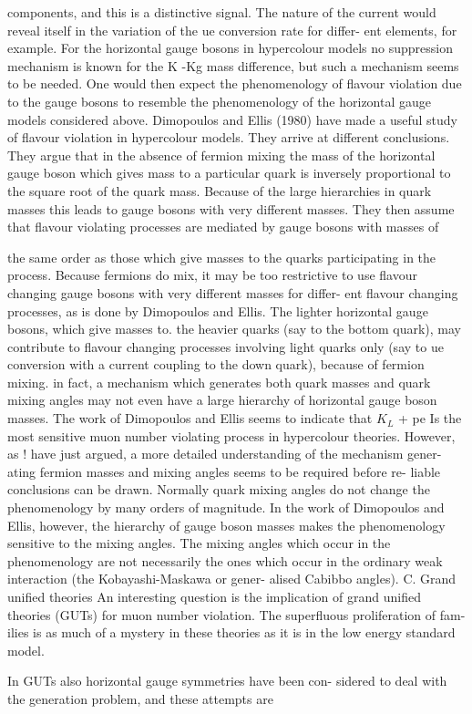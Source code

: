 \documentclass[twoside]{article}
\begin{document}
{{{{{{{{{{{{{{{components, and this is a distinctive signal. The nature of the current
would reveal itself in the variation of the ue conversion rate for differ-
ent elements, for example.
For the horizontal gauge bosons in hypercolour models no suppression
mechanism is known for the K -Kg mass difference, but such a mechanism
seems to be needed. One would then expect the phenomenology of flavour
violation due to the gauge bosons to resemble the phenomenology of the
horizontal gauge models considered above. Dimopoulos and Ellis (1980)
have made a useful study of flavour violation in hypercolour models.
They arrive at different conclusions. They argue that in the absence
of fermion mixing the mass of the horizontal gauge boson which gives mass
to a particular quark is inversely proportional to the square root of
the quark mass. Because of the large hierarchies in quark masses this
leads to gauge bosons with very different masses. They then assume that
flavour violating processes are mediated by gauge bosons with masses of

the same order as those which give masses to the quarks participating
in the process. Because fermions do mix, it may be too restrictive to
use flavour changing gauge bosons with very different masses for differ-
ent flavour changing processes, as is done by Dimopoulos and Ellis. The
lighter horizontal gauge bosons, which give masses to. the heavier quarks
(say to the bottom quark), may contribute to flavour changing processes
involving light quarks only (say to ue conversion with a current coupling
to the down quark), because of fermion mixing. in fact, a mechanism
which generates both quark masses and quark mixing angles may not even
have a large hierarchy of horizontal gauge boson masses. The work of
Dimopoulos and Ellis seems to indicate that $K_L $ + pe Is the most sensitive
muon number violating process in hypercolour theories. However, as !
have just argued, a more detailed understanding of the mechanism gener-
ating fermion masses and mixing angles seems to be required before re-
liable conclusions can be drawn. Normally quark mixing angles do not
change the phenomenology by many orders of magnitude. In the work of
Dimopoulos and Ellis, however, the hierarchy of gauge boson masses makes
the phenomenology sensitive to the mixing angles. The mixing angles
which occur in the phenomenology are not necessarily the ones which
occur in the ordinary weak interaction (the Kobayashi-Maskawa or gener-
alised Cabibbo angles).
C. Grand unified theories
An interesting question is the implication of grand unified theories
(GUTs) for muon number violation. The superfluous proliferation of fam-
ilies is as much of a mystery in these theories as it is in the low energy
standard model. {In GUTs also horizontal gauge symmetries have been con-
sidered to deal with the generation problem, and these attempts are

}}}}}}}}}}}}}}}}
\end{document}

